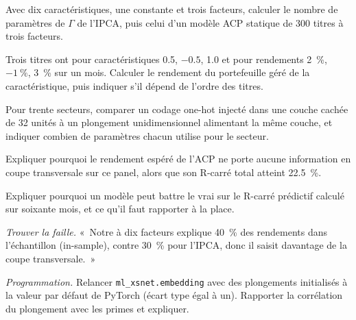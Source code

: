 \begin{exercise}[$\star$]\label{exo:ml:cross-sectional-deep-models:1}
Avec dix caractéristiques, une constante et trois facteurs, calculer le nombre de paramètres de $\Gamma$ de l'IPCA, puis celui d'un
modèle ACP statique de 300 titres à trois facteurs.
\end{exercise}

\begin{exercise}[$\star$]\label{exo:ml:cross-sectional-deep-models:2}
Trois titres ont pour caractéristiques 0.5, $-0.5$, 1.0 et pour rendements 2~\%, $-1~\%$, 3~\% sur un mois. Calculer le
rendement du portefeuille géré de la caractéristique, puis indiquer s'il dépend de l'ordre des titres.
\end{exercise}

\begin{exercise}[$\star$]\label{exo:ml:cross-sectional-deep-models:3}
Pour trente secteurs, comparer un codage one-hot injecté dans une couche cachée de 32 unités à un plongement unidimensionnel
alimentant la même couche, et indiquer combien de paramètres chacun utilise pour le secteur.
\end{exercise}

\begin{exercise}[$\star\star$]\label{exo:ml:cross-sectional-deep-models:4}
Expliquer pourquoi le rendement espéré de l'ACP ne porte aucune information en coupe transversale sur ce panel, alors que son R-carré total atteint 22.5~\%.
\end{exercise}

\begin{exercise}[$\star\star$]\label{exo:ml:cross-sectional-deep-models:5}
Expliquer pourquoi un modèle peut battre le vrai sur le R-carré prédictif calculé sur soixante mois, et ce qu'il faut rapporter à la place.
\end{exercise}

\begin{exercise}[$\star\star$]\label{exo:ml:cross-sectional-deep-models:6}
\emph{Trouver la faille.} «~Notre  à dix facteurs explique 40~\% des rendements dans l'échantillon (in-sample), contre 30~\% pour l'IPCA,
donc il saisit davantage de la coupe transversale.~»
\end{exercise}

\begin{exercise}[$\star\star\star$]\label{exo:ml:cross-sectional-deep-models:7}
\emph{Programmation.} Relancer \texttt{ml\_xsnet.embedding} avec des plongements initialisés à la valeur par défaut de PyTorch (écart type égal à un).
Rapporter la corrélation du plongement avec les primes et expliquer.
\end{exercise}

